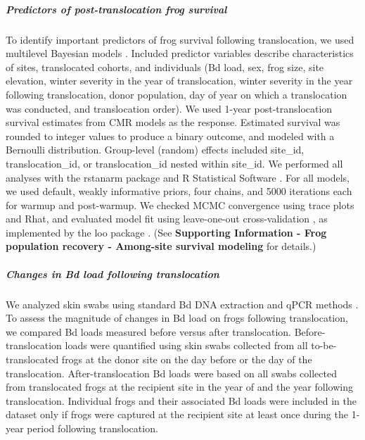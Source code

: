 \documentclass[
  letterpaper,
  DIV=11,
  numbers=noendperiod]{scrartcl}
\let\oldsubparagraph\subparagraph
\renewcommand{\subparagraph}[1]{\oldsubparagraph{#1}\mbox{}}
\begin{document}
\hypertarget{predictors-of-post-translocation-frog-survival}{%
\subparagraph{Predictors of post-translocation frog
survival}\label{predictors-of-post-translocation-frog-survival}}

To identify important predictors of frog survival following
translocation, we used multilevel Bayesian models
\citep{gelman2013, gabry2019}. Included predictor variables describe
characteristics of sites, translocated cohorts, and individuals (Bd
load, sex, frog size, site elevation, winter severity in the year of
translocation, winter severity in the year following translocation,
donor population, day of year on which a translocation was conducted,
and translocation order). We used 1-year post-translocation survival
estimates from CMR models as the response. Estimated survival was
rounded to integer values to produce a binary outcome, and modeled with
a Bernoulli distribution. Group-level (random) effects included
site\_id, translocation\_id, or translocation\_id nested within
site\_id. We performed all analyses with the rstanarm package
\citep{rstanarm2022} and R Statistical Software
\citep[v4.4.4,][]{rsoftware2022}. For all models, we used default,
weakly informative priors, four chains, and 5000 iterations each for
warmup and post-warmup. We checked MCMC convergence using trace plots
and Rhat, and evaluated model fit using leave-one-out cross-validation
\citep{vehtari2016}, as implemented by the loo package
\citep{vehtari2022}. (See \textbf{Supporting Information - Frog
population recovery - Among-site survival modeling} for details.)

\hypertarget{changes-in-bd-load-following-translocation}{%
\subparagraph{Changes in Bd load following
translocation}\label{changes-in-bd-load-following-translocation}}

We analyzed skin swabs using standard Bd DNA extraction and qPCR methods
\citep[see \textbf{Supporting Information - Frog population recovery -
Laboratory methods} for details]{boyle2004}. To assess the magnitude of
changes in Bd load on frogs following translocation, we compared Bd
loads measured before versus after translocation. Before-translocation
loads were quantified using skin swabs collected from all
to-be-translocated frogs at the donor site on the day before or the day
of the translocation. After-translocation Bd loads were based on all
swabs collected from translocated frogs at the recipient site in the
year of and the year following translocation. Individual frogs and their
associated Bd loads were included in the dataset only if frogs were
captured at the recipient site at least once during the 1-year period
following translocation.
\end{document}
